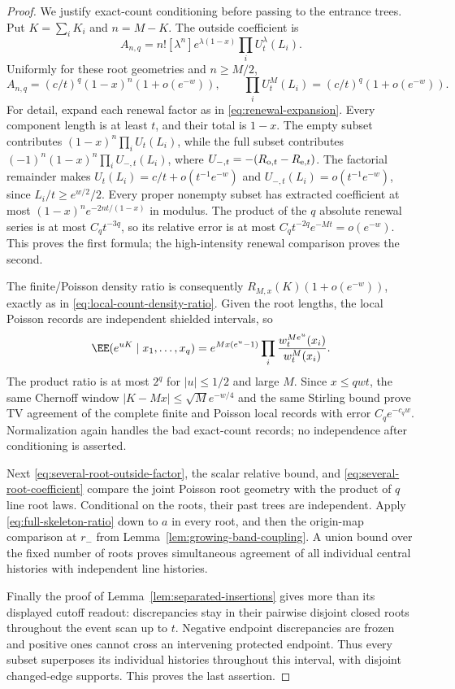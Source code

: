\documentclass[11pt,letterpaper]{article}
\begin{document}
\begin{proof}
We justify exact-count conditioning before passing to the entrance
trees. Put $K=\sum_iK_i$ and $n=M-K$. The outside coefficient is
\[
 A_{n,q}=n![\lambda^n]e^{\lambda(1-x)}
                              \prod_iU_t^\lambda(L_i).
\]
Uniformly for these root geometries and $n\ge M/2$,
\begin{equation}\label{eq:several-root-coefficient}
 A_{n,q}=(c/t)^q(1-x)^n(1+o(e^{-w})),\qquad
 \prod_iU_t^M(L_i)=(c/t)^q(1+o(e^{-w})).
\end{equation}
For detail, expand each renewal factor as in
\eqref{eq:renewal-expansion}. Every component length is at least
$t$, and their total is $1-x$. The empty subset contributes
$(1-x)^n\prod_i U_t(L_i)$, while the full subset contributes
$(-1)^n(1-x)^n\prod_i U_{-,t}(L_i)$, where
$U_{-,t}=-(R_{{\rm o},t}-R_{{\rm e},t})$.
The factorial remainder makes $U_t(L_i)=c/t+o(t^{-1}e^{-w})$
and $U_{-,t}(L_i)=o(t^{-1}e^{-w})$, since
$L_i/t\ge e^{w/2}/2$. Every proper nonempty subset has extracted
coefficient at most $(1-x)^n e^{-2nt/(1-x)}$ in modulus.
The product of the $q$ absolute renewal series is at most
$C_qt^{-3q}$, so its relative error is at most
$C_qt^{-2q}e^{-Mt}=o(e^{-w})$. This proves the first formula;
the high-intensity renewal comparison proves the second.

The finite/Poisson density ratio is consequently
$R_{M,x}(K)(1+o(e^{-w}))$, exactly as in
\eqref{eq:local-count-density-ratio}. Given the root lengths,
the local Poisson records are independent shielded intervals, so
\[
 \EE(e^{uK}\mid x_1,\ldots,x_q)
 =e^{Mx(e^u-1)}
                 \prod_i\frac{w_t^{Me^u}(x_i)}{w_t^M(x_i)}.
\]
The product ratio is at most $2^q$ for $|u|\le1/2$ and large $M$.
Since $x\le qwt$, the same Chernoff window
$|K-Mx|\le\sqrt M e^{-w/4}$ and the same Stirling bound prove
TV agreement of the complete finite and Poisson local records
with error $C_qe^{-c_qw}$. Normalization again handles the bad
exact-count records; no independence after conditioning is asserted.

Next \eqref{eq:several-root-outside-factor}, the scalar relative
bound, and \eqref{eq:several-root-coefficient} compare the joint
Poisson root geometry with the product of $q$ line root laws.
Conditional on the roots, their past trees are independent.
Apply \eqref{eq:full-skeleton-ratio} down to $a$ in every root,
and then the origin-map comparison at $r_-$ from
Lemma~\ref{lem:growing-band-coupling}. A union bound over the
fixed number of roots proves simultaneous agreement of all
individual central histories with independent line histories.

Finally the proof of Lemma~\ref{lem:separated-insertions} gives
more than its displayed cutoff readout: discrepancies stay in
their pairwise disjoint closed roots throughout the event scan
up to $t$. Negative endpoint discrepancies are frozen and
positive ones cannot cross an intervening protected endpoint.
Thus every subset superposes its individual histories throughout
this interval, with disjoint changed-edge supports. This proves
the last assertion.
\end{proof}
\end{document}
